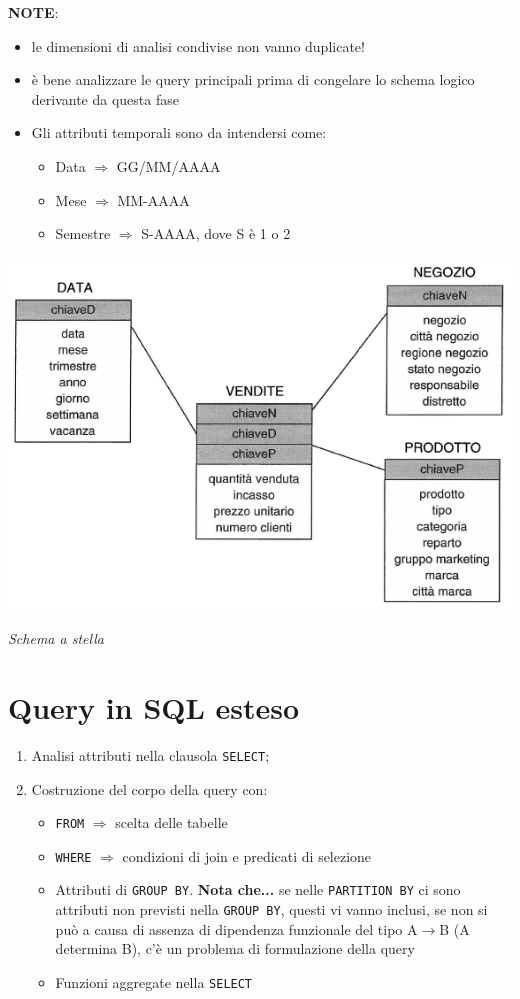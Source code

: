 \documentclass[12pt]{article}
\begin{document}
\textbf{NOTE}:

\begin{itemize}
    \item le dimensioni di analisi condivise non vanno duplicate!
    \item è bene analizzare le query principali prima di congelare lo schema logico derivante da questa fase
    \item Gli attributi temporali sono da intendersi come: 
    \begin{itemize}
        \item Data $\Rightarrow$ GG/MM/AAAA
        \item Mese $\Rightarrow$ MM-AAAA
        \item Semestre $\Rightarrow$ S-AAAA, dove S è 1 o 2
    \end{itemize}
\end{itemize}

\begin{center}
    \centering
    \includegraphics[width=0.6\linewidth]{star.PNG}
    
    \textit{Schema a stella}
\end{center}

\section{Query in SQL esteso}
\begin{enumerate}
    \item Analisi attributi nella clausola \texttt{SELECT}; 
    \item Costruzione del corpo della query con:
    \begin{itemize}
        \item  \texttt{FROM} $\Rightarrow$ scelta delle tabelle
        \item \texttt{WHERE} $\Rightarrow$ condizioni di join e predicati di selezione
        \item Attributi di \texttt{GROUP BY}. \textbf{Nota che...} se nelle \texttt{PARTITION BY} ci sono attributi non previsti nella \texttt{GROUP BY}, questi vi vanno inclusi, se non si può a causa di assenza di dipendenza funzionale del tipo A$\rightarrow$B (A determina B), c'è un problema di formulazione della query
        \item Funzioni aggregate nella \texttt{SELECT} 
    \end{itemize}
\end{enumerate}
\end{document}
